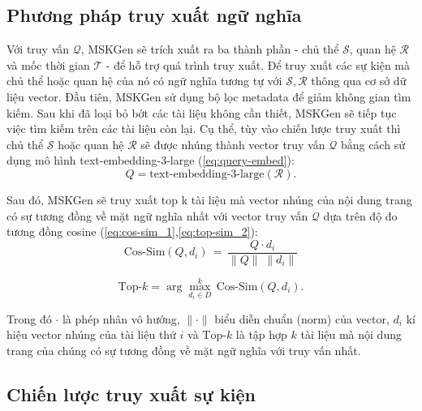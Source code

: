 \vspace{1em}
\subsection{Phương pháp truy xuất ngữ nghĩa}

Với truy vấn $\mathcal{Q}$, MSKGen sẽ trích xuất ra ba thành phần - chủ thể $\mathcal{S}$, quan hệ $\mathcal{R}$ và mốc thời gian $\mathcal{T}$ - để hỗ trợ quá trình truy xuất. Để truy xuất các sự kiện mà chủ thể hoặc quan hệ của nó có ngữ nghĩa tương tự với $\mathcal{S, R}$ thông qua cơ sở dữ liệu vector. Đầu tiên, MSKGen sử dụng bộ lọc metadata để giảm không gian tìm kiếm. Sau khi đã loại bỏ bớt các tài liệu không cần thiết, MSKGen sẽ tiếp tục việc tìm kiếm trên các tài liệu còn lại. Cụ thể, tùy vào chiến lược truy xuất thì chủ thể $\mathcal{S}$ hoặc quan hệ $\mathcal{R}$ sẽ được nhúng thành vector truy vấn $\mathcal{Q}$ bằng cách sử dụng mô hình text-embedding-3-large (\ref{eq:query-embed}):
\begin{equation}  
\label{eq:query-embed}  
Q = \text{text-embedding-3-large}(\mathcal{R}). 
\end{equation}

Sau đó, MSKGen sẽ truy xuất top k tài liệu mà vector nhúng của nội dung trang có sự tương đồng về mặt ngữ nghĩa nhất với vector truy vấn $\mathcal{Q}$ dựa trên độ đo tương đồng cosine (\ref{eq:cos-sim_1},\ref{eq:top-sim_2}):
\begin{equation}  
\label{eq:cos-sim_1}  
\text{Cos-Sim}(Q, d_{i})   
\,=\, \frac{Q \cdot d_{i}}{\|Q\|\;\|d_{i}\|}  
\end{equation}

\begin{equation}  
\label{eq:top-sim_2}  
\text{Top-}k   
= \arg\max_{d_i \in D}^{k}\,\text{Cos-Sim}(Q, d_i).    
\end{equation} 

Trong đó $\cdot$ là phép nhân vô hướng, $\|\cdot\|$ biểu diễn chuẩn (norm) của vector, $d_{i}$ kí hiệu vector nhúng của tài liệu thứ $i$ và $\text{Top-}k$ là tập hợp $k$ tài liệu mà nội dung trang của chúng có sự tương đồng về mặt ngữ nghĩa với truy vấn nhất.

\vspace{1em}
\subsection{Chiến lược truy xuất sự kiện}

